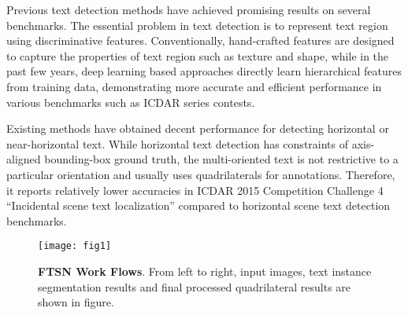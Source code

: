 \documentclass[a4paper,conference]{IEEEtran}
\begin{document}
Previous text detection methods\cite{Chen2004Detecting, epshtein2010detecting,Buta2015FASText,Tian2016Text,Jaderberg2016Reading} have achieved promising results on several benchmarks. The essential problem in text detection is to represent text region using discriminative features. Conventionally, hand-crafted features are designed\cite{epshtein2010detecting,Neumann2012Real,Zamberletti2014Text} to capture the properties of text region such as texture and shape, while in the past few years, deep learning based approaches\cite{Huang2014Robust,Jaderberg2014Deep,Jaderberg2016Reading,Gupta2016Synthetic,Zhang2016Multi,Liao2016TextBoxes} directly learn hierarchical features from training data, demonstrating more accurate and efficient performance in various benchmarks such as ICDAR series contests\cite{Shahab2011ICDAR,Karatzas2013ICDAR,Karatzas2015ICDAR}.

Existing methods\cite{Jaderberg2014Deep,Huang2014Robust,Jaderberg2016Reading,Liao2016TextBoxes} have obtained decent performance for detecting horizontal or near-horizontal text. While horizontal text detection has constraints of axis-aligned bounding-box ground truth, the multi-oriented text is not restrictive to a particular orientation and usually uses quadrilaterals for annotations. Therefore, it reports relatively lower accuracies in ICDAR
2015 Competition Challenge 4 “Incidental scene text localization”\cite{Karatzas2015ICDAR} compared to horizontal scene text detection benchmarks\cite{Shahab2011ICDAR,Karatzas2013ICDAR}.
\begin{figure}[h]
\begin{center}
  
\texttt{[image: fig1]}
\caption{\textbf{FTSN Work Flows}. From left to right, input images, text instance segmentation results and final processed quadrilateral results are shown in figure. } 

\end{center}
\end{figure}
\end{document}
